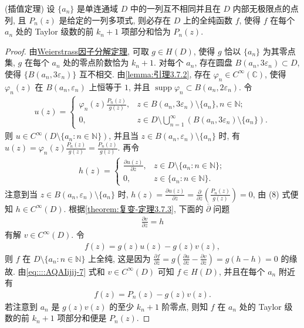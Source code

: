 \documentclass[../../main.tex]{subfiles}%
\begin{document}
\begin{theorem}
(插值定理) 设 \(\{a_n\}\) 是单连通域 \(D\) 中的一列互不相同并且在 \(D\) 内部无极限点的点列, 且 \(P_n(z)\) 是给定的一列多项式, 则必存在 \(D\) 上的全纯函数 \(f\), 使得 \(f\) 在每个 \(a_n\) 处的 Taylor 级数的前 \(k_n+1\) 项部分和恰为 \(P_n(z)\).
\end{theorem}
\begin{proof}
由\hyperref[theorem:Weierstrass因子分解定理]{Weierstrass因子分解定理}, 可取 \(g \in H(D)\), 使得 \(g\) 恰以 \(\{a_n\}\) 为其零点集, \(g\) 在每个 \(a_n\) 处的零点阶数恰为 \(k_n+1\). 对每个 \(a_n\), 存在圆盘 \(B(a_n,3\varepsilon_n)\subset D\), 使得 \(\{B(a_n,3\varepsilon_n)\}\) 互不相交. 由\cref{lemma:引理3.7.2}, 存在 \(\varphi_n \in C^\infty(\mathbb{C})\), 使得 \(\varphi_n(z)\) 在 \(B(a_n,\varepsilon_n)\) 上恒等于 \(1\), 并且 \(\operatorname{supp}\varphi_n \subset B(a_n,2\varepsilon_n)\). 令
\begin{align*}
u(z) = \begin{cases}
\varphi_n(z)\frac{P_n(z)}{g(z)}, & z \in B(a_n,3\varepsilon_n) \setminus \{a_n\}, n \in \mathbb{N}; \\
0, & z \in D \setminus \bigcup\limits_{n=1}^\infty (B(a_n,3\varepsilon_n) \setminus \{a_n\}).
\end{cases}
\end{align*}
则 \(u \in C^\infty(D \setminus \{a_n: n \in \mathbb{N}\})\), 并且当 \(z \in B(a_n,\varepsilon_n) \setminus \{a_n\}\) 时, 有 \(u(z) = \varphi_n(z)\frac{P_n(z)}{g(z)} = \frac{P_n(z)}{g(z)}\). 再令
\begin{align*}
h(z) = \begin{cases}
\frac{\partial u(z)}{\partial \overline{z}}, & z \in D \setminus \{a_n: n \in \mathbb{N}\}; \\
0, & z \in \{a_n: n \in \mathbb{N}\}.
\end{cases}
\end{align*}
注意到当 \(z \in B(a_n,\varepsilon_n) \setminus \{a_n\}\) 时, \(h(z) = \frac{\partial u(z)}{\partial \overline{z}} = \frac{\partial}{\partial \overline{z}}\left(\frac{P_n(z)}{g(z)}\right) = 0\), 由 (8) 式便知 \(h \in C^\infty(D)\). 根据\cref{theorem:复变-定理3.7.3}, 下面的 \(\overline{\partial}\) 问题
\begin{align}
\frac{\partial v}{\partial \overline{z}} = h\label{eq::::AQAIijij-7}
\end{align}
有解 \(v \in C^\infty(D)\). 令
\begin{align*}
f(z) = g(z)u(z) - g(z)v(z),
\end{align*}
则 \(f\) 在 \(D \setminus \{a_n: n \in \mathbb{N}\}\) 上全纯, 这是因为 \(\frac{\partial f}{\partial \overline{z}} = g\left( \frac{\partial u}{\partial \overline{z}} - \frac{\partial v}{\partial \overline{z}} \right) = g(h-h) = 0\) 的缘故. 由\eqref{eq::::AQAIijij-7} 式和 \(v \in C^\infty(D)\) 可知 \(f \in H(D)\), 并且在每个 \(a_n\) 附近有
\begin{align*}
f(z) = P_n(z) - g(z)v(z).
\end{align*}
若注意到 \(a_n\) 是 \(g(z)v(z)\) 的至少 \(k_n+1\) 阶零点, 则知 \(f\) 在 \(a_n\) 处的 Taylor 级数的前 \(k_n+1\) 项部分和便是 \(P_n(z)\).
\end{proof}
\end{document}
